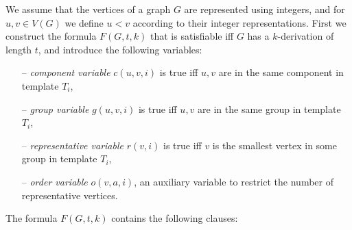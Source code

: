 We assume that the vertices of a graph $G$ are represented using integers, and for $u,v \in V(G)$ we define $u<v$ according to their integer representations.
First we construct the formula $F(G,t,k)$ that is satisfiable iff $G$ has a $k$-derivation of length $t$, and introduce the following variables:
\begin{itemize}
	\item[--] {\em component variable} $c(u,v,i)$ is true iff $u,v$ are in the same component in template $T_i$,
	\item[--] {\em group variable} $g(u,v,i)$ is true iff $u,v$ are in the same group in template $T_i$,
	\item[--] {\em representative variable} $r(v,i)$ is true iff $v$ is the smallest vertex in some group in template $T_i$,
	\item[--] {\em order variable} $o(v,a,i)$, an auxiliary variable to restrict the number of representative vertices.
\end{itemize}
The formula $F(G,t,k)$ contains the following clauses:
